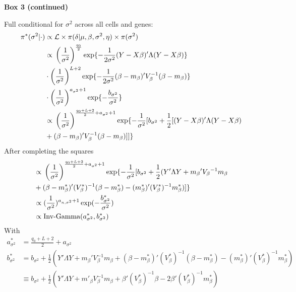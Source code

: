 \newpage

\begin{Comment}
\textbf{Box 3 (continued)}

Full conditional for $\sigma^2$ across all cells and genes:
\begin{align*}
\pi^*(\sigma^2|\cdot)&\propto{}\mathcal{L}\times\pi(\delta|\mu,\beta,\sigma^2,\eta)\times\pi(\sigma^2)\\
&\propto{}\left(\frac{1}{\sigma^2}\right)^{\frac{q_0}{2}}\exp\lbrace-\frac{1}{2\sigma^2}(Y-X\beta)'\Lambda(Y-X\beta)\rbrace\\
&\cdot\left(\frac{1}{\sigma^2}\right)^{L+2}\exp\lbrace-\frac{1}{2\sigma^2}(\beta-m_\beta{})'V_\beta^{-1}(\beta-m_\beta{})\rbrace\\
&\cdot\left(\frac{1}{\sigma^2}\right)^{a_{\sigma^2}+1}\exp\lbrace-\frac{b_{\sigma^2}}{\sigma^2}\rbrace\\
&\propto{}\left(\frac{1}{\sigma^2}\right)^{\frac{q_0+L+2}{2}+a_{\sigma^2}+1}\exp\lbrace-\frac{1}{\sigma^2}[b_{\sigma^2}+\frac{1}{2}[(Y-X\beta)'\Lambda(Y-X\beta) \\
&+ (\beta-m_\beta{})'V_\beta^{-1}(\beta-m_\beta{})]]\rbrace
\end{align*} 
After completing the squares
\begin{align*}
&\propto{}\left(\frac{1}{\sigma^2}\right)^{\frac{q_0+L+2}{2}+a_{\sigma^2}+1}\exp\lbrace-\frac{1}{\sigma^2}[b_{\sigma^2}+\frac{1}{2}(Y'\Lambda{}Y+m_\beta{}'V_\beta{}^{-1}m_\beta{}\\
&+(\beta-m^*_{\beta})'(V^*_{\beta})^{-1}(\beta-m^*_{\beta})-(m^*_{\beta})'(V^*_{\beta})^{-1}m^*_{\beta})]\rbrace\\
&\propto{}(\frac{1}{\sigma^2})^{a_{n,\sigma^2}+1}\exp(-\frac{b^*_{\sigma^2}}{\sigma^2})\\
&\propto{}\textnormal{Inv-Gamma}(a^*_{\sigma^2},b^*_{\sigma^2})
\end{align*}
With
\begin{align*}
a^*_{\sigma^2}&=\frac{q_0+L+2}{2}+a_{\sigma^2}\\
b^*_{\sigma^2}&=b_{\sigma^2}+\frac{1}{2}(Y'\Lambda{}Y+m_\beta'V_\beta^{-1}m_\beta+(\beta-m^*_{\beta})'(V^*_{\beta})^{-1}(\beta-m^*_{\beta})-(m^*_{\beta})'(V^*_{\beta})^{-1}m^*_{\beta})\\
&\equiv{}b_{\sigma^2}+\frac{1}{2}(Y'\Lambda Y+ m'_{\beta} V_\beta^{-1} m_\beta + \beta' (V^*_{\beta})^{-1} \beta - 2 \beta' (V^*_{\beta})^{-1} m^*_{\beta} )
\end{align*}
\end{Comment}

